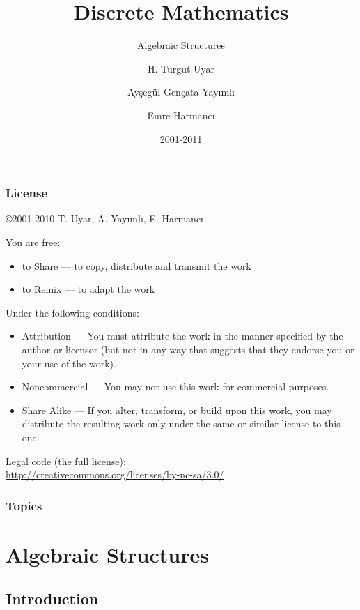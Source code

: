 \documentclass[dvipsnames]{beamer}
\title{Discrete Mathematics}
\subtitle{Algebraic Structures}
\author{H. Turgut Uyar \and Ayşegül Gençata Yayımlı \and Emre Harmancı}
\date{2001-2011}
\begin{document}
\begin{frame}
  \titlepage
\end{frame}

\begin{frame}
  \frametitle{License}

  \hfill
  \copyright 2001-2010 T. Uyar, A. Yayımlı, E. Harmancı

  \vfill
  \begin{tiny}
    You are free:
    \begin{itemize}
      \item to Share — to copy, distribute and transmit the work
      \item to Remix — to adapt the work
    \end{itemize}

    Under the following conditions:
    \begin{itemize}
      \item Attribution — You must attribute the work in the manner specified by
        the author or licensor (but not in any way that suggests that they
        endorse you or your use of the work).

      \item Noncommercial — You may not use this work for commercial purposes.

      \item Share Alike — If you alter, transform, or build upon this work, you
        may distribute the resulting work only under the same or similar license
        to this one.
    \end{itemize}
  \end{tiny}

  \vfill
  Legal code (the full license):\\
  \url{http://creativecommons.org/licenses/by-nc-sa/3.0/}
\end{frame}

\begin{frame}
  \frametitle{Topics}
  \tableofcontents
\end{frame}

\section{Algebraic Structures}

\subsection{Introduction}
\end{document}
